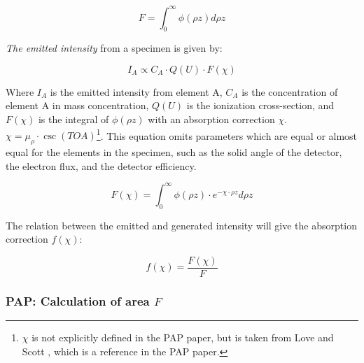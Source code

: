 \begin{equation}
    \label{eq:theory:quantitative:pap:general_principle:F}
    F = \int_0^\infty \phi(\rho z) d\rho z
\end{equation}


\emph{The emitted intensity} from a specimen is given by:

\begin{equation}
    \label{eq:theory:quantitative:pap:general_principle:I_A}
    I_A \propto C_A \cdot Q(U) \cdot F(\chi)
\end{equation}

Where $I_A$ is the emitted intensity from element A, $C_A$ is the concentration of element A in mass concentration, $Q(U)$ is the ionization cross-section, and $F(\chi)$ is the integral of $\phi(\rho z)$ with an absorption correction $\chi$.
$ \chi = \mu_\rho \cdot \csc(TOA)$\footnote{$\chi$ is not explicitly defined in the PAP paper, but is taken from Love and Scott \cite[Eq. (1)]{love_scott_1990}, which is a reference in the PAP paper.}.
This equation omits parameters which are equal or almost equal for the elements in the specimen, such as the solid angle of the detector, the electron flux, and the detector efficiency.


\begin{equation}
    \label{eq:theory:quantitative:pap:general_principle:f_of_chi}
    F(\chi) = \int_0^\infty \phi(\rho z) \cdot e^{-\chi \cdot \rho z} d\rho z
\end{equation}


The relation between the emitted and generated intensity will give the absorption correction $f(\chi)$:

\begin{equation}
    \label{eq:theory:quantitative:pap:general_principle:f_absorption_correction}
    f(\chi) = \frac{F(\chi)}{F}
\end{equation}















\subsubsection{PAP: Calculation of area $F$}
\label{theory:quantitative:pap:calculation_of_F}

